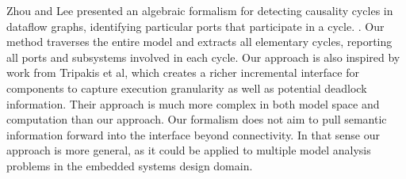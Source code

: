 Zhou and Lee presented an algebraic formalism for detecting causality cycles
in dataflow graphs, identifying particular ports that participate in a cycle.
\cite{comp:causality}. Our method traverses the entire model and extracts all 
elementary cycles,
reporting all ports and subsystems involved in each cycle.
Our approach is also inspired by work from Tripakis et al, which 
creates a richer incremental interface for components to capture execution 
granularity as well as potential deadlock information\cite{moc:hsdf}.  
Their approach is much more complex in both model space and computation than our approach. Our formalism does not aim to pull 
semantic information forward into the interface beyond connectivity.  In that sense our approach is more general, as it could be applied to multiple 
model analysis problems in the embedded systems design domain.
